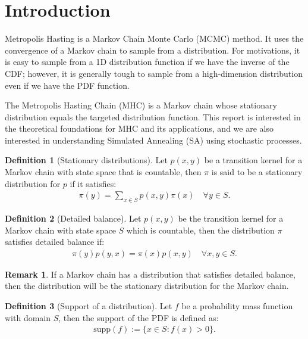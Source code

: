 \documentclass[]{article}
\theoremstyle{definition}
\newtheorem{definition}{Definition}
\newtheorem{remark}{Remark}[subsection]
{
    \newtheorem{assumption}{Assumption}
}
\begin{document}
\section{Introduction}
    Metropolis Hasting is a Markov Chain Monte Carlo (MCMC) method. It uses the convergence of a Markov chain to sample from a distribution. For motivations, it is easy to sample from a 1D distribution function if we have the inverse of the CDF; however, it is generally tough to sample from a high-dimension distribution even if we have the PDF function. 
    \par
    The Metropolis Hasting Chain (MHC) is a Markov chain whose stationary distribution equals the targeted distribution function. This report is interested in the theoretical foundations for MHC and its applications, and we are also interested in understanding Simulated Annealing (SA) using stochastic processes. 
    \begin{definition}[Stationary distributions]
        Let $p(x, y)$ be a transition kernel for a Markov chain with state space that is countable, then $\pi$ is said to be a stationary distribution for $p$ if it satisfies: 
        \begin{align*}
            \pi(y) = \sum_{x\in S}p(x, y)\pi(x) \quad \forall y \in S. 
        \end{align*}
    \end{definition}
    \begin{definition}[Detailed balance]
        Let $p(x, y)$ be the transition kernel for a Markov chain with state space $S$ which is countable, then the distribution $\pi$ satisfies detailed balance if: 
        \begin{align*}
            \pi(y)p(y, x) = \pi(x)p(x, y) \quad \forall x, y\in S. 
        \end{align*}
    \end{definition}
    \begin{remark}
        If a Markov chain has a distribution that satisfies detailed balance, then the distribution will be the stationary distribution for the Markov chain. 
    \end{remark}
    \begin{definition}[Support of a distribution]
        Let $f$ be a probability mass function with domain $S$, then the support of the PDF is defined as: 
        \begin{align*}
           \text{supp}(f):= \{x\in S: f(x) > 0\}. 
        \end{align*}
    \end{definition}
    
\end{document}

